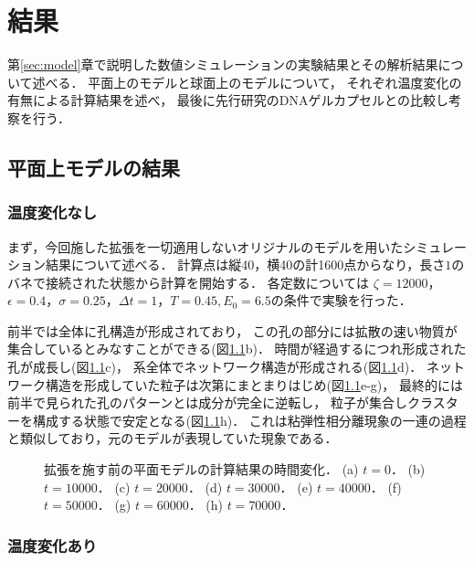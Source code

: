 \chapter{結果}

第\ref{sec:model}章で説明した数値シミュレーションの実験結果とその解析結果について述べる．
平面上のモデルと球面上のモデルについて，
それぞれ温度変化の有無による計算結果を述べ，
最後に先行研究のDNAゲルカプセルとの比較し考察を行う．

\section{平面上モデルの結果}

\subsection{温度変化なし}

まず，今回施した拡張を一切適用しないオリジナルのモデルを用いたシミュレーション結果について述べる．
計算点は縦40，横40の計1600点からなり，長さ$1$のバネで接続された状態から計算を開始する．
各定数については
$\zeta=12000$，$\epsilon=0.4$，$\sigma=0.25$，$\Delta t=1$，$T=0.45, E_0=6.5$の条件で実験を行った．

前半では全体に孔構造が形成されており，
この孔の部分には拡散の速い物質が集合しているとみなすことができる(図\ref{fig:result_2d_without_anearing}b)．
時間が経過するにつれ形成された孔が成長し(図\ref{fig:result_2d_without_anearing}c)，
系全体でネットワーク構造が形成される(図\ref{fig:result_2d_without_anearing}d)．
ネットワーク構造を形成していた粒子は次第にまとまりはじめ(図\ref{fig:result_2d_without_anearing}e-g)，
最終的には前半で見られた孔のパターンとは成分が完全に逆転し，
粒子が集合しクラスターを構成する状態で安定となる(図\ref{fig:result_2d_without_anearing}h)．
これは粘弾性相分離現象の一連の過程と類似しており，元のモデルが表現していた現象である．

\begin{figure}
\centering

\caption{
    拡張を施す前の平面モデルの計算結果の時間変化．
    (a) $t=0$．
    (b) $t=10000$．
    (c) $t=20000$．
    (d) $t=30000$．
    (e) $t=40000$．
    (f) $t=50000$．
    (g) $t=60000$．
    (h) $t=70000$．
}
\label{fig:result_2d_without_anearing}
\end{figure}

\subsection{温度変化あり}

